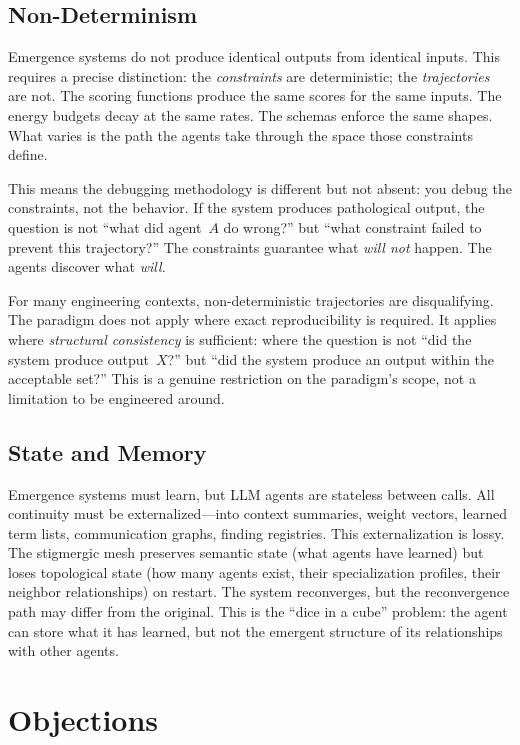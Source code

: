 \documentclass[11pt,twocolumn]{article}
\begin{document}
\subsection{Non-Determinism}

Emergence systems do not produce identical outputs from identical
inputs.  This requires a precise distinction: the \emph{constraints} are
deterministic; the \emph{trajectories} are not.  The scoring functions
produce the same scores for the same inputs.  The energy budgets decay
at the same rates.  The schemas enforce the same shapes.  What varies is
the path the agents take through the space those constraints define.

This means the debugging methodology is different but not absent: you
debug the constraints, not the behavior.  If the system produces
pathological output, the question is not ``what did agent~$A$ do
wrong?'' but ``what constraint failed to prevent this trajectory?''
The constraints guarantee what \emph{will not} happen.  The agents
discover what \emph{will.}

For many engineering contexts, non-deterministic trajectories are
disqualifying.  The paradigm does not apply where exact reproducibility
is required.  It applies where \emph{structural consistency} is
sufficient: where the question is not ``did the system produce
output~$X$?'' but ``did the system produce an output within the
acceptable set?''  This is a genuine restriction on the paradigm's
scope, not a limitation to be engineered around.

\subsection{State and Memory}

Emergence systems must learn, but LLM agents are stateless between
calls.  All continuity must be externalized---into context summaries,
weight vectors, learned term lists, communication graphs, finding
registries.  This externalization is lossy.  The stigmergic mesh
preserves semantic state (what agents have learned) but loses
topological state (how many agents exist, their specialization profiles,
their neighbor relationships) on restart.  The system reconverges, but
the reconvergence path may differ from the original.  This is the
``dice in a cube'' problem: the agent can store what it has learned, but
not the emergent structure of its relationships with other agents.

\section{Objections}
\label{sec:objections}
\end{document}

